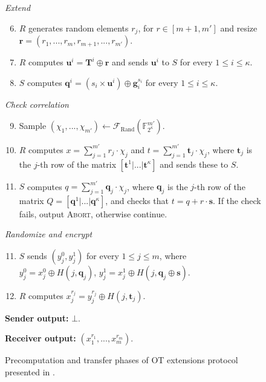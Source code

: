 \begin{figure}[!t]
{{    \textit{\hspace{0.25cm} Extend}
    \begin{enumerate}
    \setcounter{enumi}{5}
        \item $R$ generates random elements $r_j$, for $r\in [m+1, m']$ and resize $\boldsymbol{r} = (r_1, ..., r_m, r_{m+1}, ..., r_{m'})$.
        \item $R$ computes $\boldsymbol{u}^i = \boldsymbol{T}^i \oplus \boldsymbol{r}$ and sends $\boldsymbol{u}^i$ to $S$ for every $1\leq i\leq \kappa$.
        \item $S$ computes $\boldsymbol{q}^i = (s_i \times \boldsymbol{u}^i) \oplus \boldsymbol{g}^{s_i}_i$ for every $1\leq i\leq \kappa$.
    \end{enumerate}
    \textit{\hspace{0.25cm} Check correlation}
    \begin{enumerate}
    \setcounter{enumi}{8}
        \item Sample $(\chi_1, ..., \chi_{m'})\leftarrow \mathcal{F}_{\text{Rand}}(\mathbb{F}^{m'}_{2^\kappa})$.
        \item $R$ computes $x = \sum_{j=1}^{m'} r_j \cdot \chi_j$ and $t = \sum_{j=1}^{m'} \boldsymbol{t}_j \cdot \chi_j$, where $\boldsymbol{t}_j$ is the $j$-th row of the matrix $[ \boldsymbol{t}^1 | ...| \boldsymbol{t}^\kappa]$ and sends these to $S$.
        \item $S$ computes $q = \sum_{j=1}^{m'} \boldsymbol{q}_j \cdot \chi_j$, where $\boldsymbol{q}_j$ is the $j$-th row of the matrix $Q = [ \boldsymbol{q}^1 | ...| \boldsymbol{q}^\kappa]$, and checks that $t = q + r\cdot \boldsymbol{s}$. If the check fails, output \textsc{Abort}, otherwise continue. %
    \end{enumerate} 
    
    \textit{\hspace{0.25cm} Randomize and encrypt}
    \begin{enumerate}
    \setcounter{enumi}{10}
        \item $S$ sends $(y^0_j, y^1_j)$ for every $1\leq j\leq m$, where $y^0_j = x^0_j\oplus H(j,\boldsymbol{q}_j)$, $y^1_j = x^1_j\oplus H(j,\boldsymbol{q}_j\oplus \boldsymbol{s})$. %
        \item $R$ computes $x^{r_j}_j = y^{r_j}_j \oplus H(j, \boldsymbol{t}_j)$.
    \end{enumerate} 
    
    \textbf{Sender output:} $\bot$.
    
    \textbf{Receiver output:} $(x^{r_1}_1, ..., x^{r_m}_m)$.
    }%
}
\caption{Precomputation and transfer phases of OT extensions protocol presented in \cite{K15}.}
\label{fig:K15Protocol}
\end{figure}

